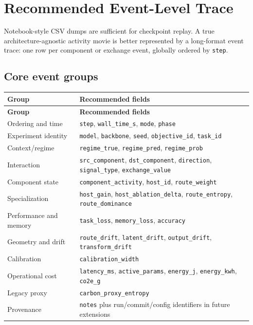\documentclass[11pt,a4paper]{article}
\newcommand{\code}[1]{\texttt{#1}}
\begin{document}
\section{Recommended Event-Level Trace}

Notebook-style CSV dumps are sufficient for checkpoint replay. A true architecture-agnostic activity movie is better represented by a long-format event trace: one row per component or exchange event, globally ordered by \code{step}.

\subsection{Core event groups}

\begin{longtable}{@{}P{37mm}P{126mm}@{}}
\toprule
\textbf{Group} & \textbf{Recommended fields}\\
\midrule
\endfirsthead
\toprule
\textbf{Group} & \textbf{Recommended fields}\\
\midrule
\endhead
Ordering and time & \code{step}, \code{wall\_time\_s}, \code{mode}, \code{phase}\\
Experiment identity & \code{model}, \code{backbone}, \code{seed}, \code{objective\_id}, \code{task\_id}\\
Context/regime & \code{regime\_true}, \code{regime\_pred}, \code{regime\_prob}\\
Interaction & \code{src\_component}, \code{dst\_component}, \code{direction}, \code{signal\_type}, \code{exchange\_value}\\
Component state & \code{component\_activity}, \code{host\_id}, \code{route\_weight}\\
Specialization & \code{host\_gain}, \code{host\_ablation\_delta}, \code{route\_entropy}, \code{route\_dominance}\\
Performance and memory & \code{task\_loss}, \code{memory\_loss}, \code{accuracy}\\
Geometry and drift & \code{route\_drift}, \code{latent\_drift}, \code{output\_drift}, \code{transform\_drift}\\
Calibration & \code{calibration\_width}\\
Operational cost & \code{latency\_ms}, \code{active\_params}, \code{energy\_j}, \code{energy\_kwh}, \code{co2e\_g}\\
Legacy proxy & \code{carbon\_proxy\_entropy}\\
Provenance & \code{notes} plus run/commit/config identifiers in future extensions\\
\bottomrule
\end{longtable}
\end{document}
